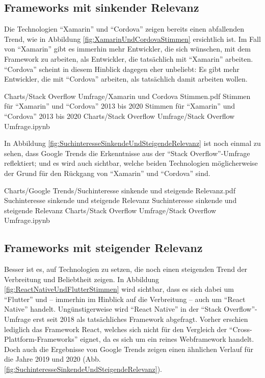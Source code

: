 \subsection{Frameworks mit sinkender Relevanz}

Die Technologien \enquote{Xamarin} und \enquote{Cordova} zeigen bereits einen abfallenden Trend, wie in Abbildung \ref{fig:XamarinUndCordovaStimmen} ersichtlich ist.
Im Fall von \enquote{Xamarin} gibt es immerhin mehr Entwickler, die sich wünschen, mit dem Framework zu arbeiten, als Entwickler, die tatsächlich mit \enquote{Xamarin} arbeiten.
\enquote{Cordova} scheint in diesem Hinblick dagegen eher unbeliebt: Es gibt mehr Entwickler, die mit \enquote{Cordova} arbeiten, als tatsächlich damit arbeiten wollen.

\begin{alexfigurewithnotebook}{Charts/Stack Overflow Umfrage/Xamarin und Cordova Stimmen.pdf}
	{Stimmen für \enquote{Xamarin} und \enquote{Cordova} 2013 bis 2020}
	{Stimmen für \enquote{Xamarin} und \enquote{Cordova} 2013 bis 2020}
	{Charts/Stack Overflow Umfrage/Stack Overflow Umfrage.ipynb}
	{}
	\label{fig:XamarinUndCordovaStimmen}

\end{alexfigurewithnotebook}


In Abbildung \ref{fig:SuchinteresseSinkendeUndSteigendeRelevanz} ist noch einmal zu sehen, dass Google Trends die Erkenntnisse aus der \enquote{Stack Overflow}-Umfrage reflektiert;
und es wird auch sichtbar, welche beiden Technologien möglicherweise der Grund für den Rückgang von \enquote{Xamarin} und \enquote{Cordova} sind.

\begin{alexfigurewithnotebook}{Charts/Google Trends/Suchinteresse sinkende und steigende Relevanz.pdf}
	{Suchinteresse sinkende und steigende Relevanz}
	{Suchinteresse sinkende und steigende Relevanz}
	{Charts/Stack Overflow Umfrage/Stack Overflow Umfrage.ipynb}
	{}
	\label{fig:SuchinteresseSinkendeUndSteigendeRelevanz}

\end{alexfigurewithnotebook}

\subsection{Frameworks mit steigender Relevanz}

Besser ist es, auf Technologien zu setzen, die noch einen steigenden Trend der Verbreitung und Beliebtheit zeigen.
In Abbildung \ref{fig:ReactNativeUndFlutterStimmen} wird sichtbar, dass es sich dabei um \enquote{Flutter} und -- immerhin im Hinblick auf die Verbreitung -- auch um \enquote{React Native} handelt.
Ungünstigerweise wird \enquote{React Native} in der \enquote{Stack Overflow}-Umfrage erst seit 2018 als tatsächliches Framework abgefragt.
Vorher erschien lediglich das Framework React, welches sich nicht für den Vergleich der \enquote{Cross-Plattform-Frameworks} eignet, da es sich um ein reines Webframework handelt.
Doch auch die Ergebnisse von Google Trends zeigen einen ähnlichen Verlauf für die Jahre 2019 und 2020 (Abb. \ref{fig:SuchinteresseSinkendeUndSteigendeRelevanz}).


